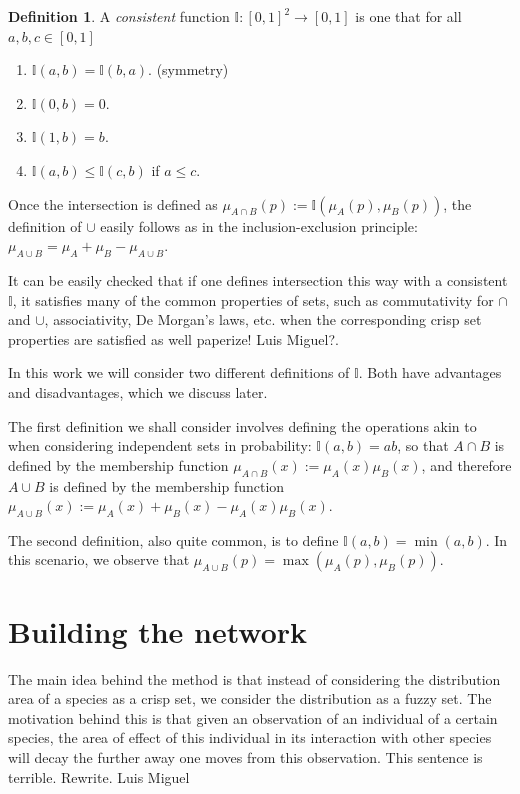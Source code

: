 \documentclass[12pt]{article}
\numberwithin{equation}{section} %
\numberwithin{figure}{section} %
\def\II{{\mathbb{I}}}
\theoremstyle{definition}
\newtheorem{definition}[theorem]{Definition}
\def\tcr#1{\textcolor{MyRed}{#1}}
\begin{document}
\begin{definition}
A \emph{consistent} function $\II : [0,1]^2 \to [0,1]$ is one that for all $a,b,c\in[0,1]$
\begin{enumerate}
  \item $\II(a,b) = \II(b,a)$. (symmetry)
  \item $\II(0,b) = 0$.
  \item $\II(1,b) = b$.
  \item $\II(a,b) \leq \II(c,b)$ if $a \leq c$.
\end{enumerate}
\end{definition}

Once the intersection is defined as $\mu_{A\cap B}(p) := \II(\mu_A(p),\mu_B(p))$, the definition of $\cup$ easily follows as in the inclusion-exclusion principle: $\mu_{A\cup B} = \mu_A + \mu_B - \mu_{A\cup B}$.

It can be easily checked that if one defines intersection this way with a consistent $\II$, it satisfies many of the common properties of sets, such as commutativity for $\cap$ and $\cup$, associativity, De Morgan's laws, etc. when the corresponding crisp set properties are satisfied as well \tcr{paperize! Luis Miguel?}.



In this work we will consider two different definitions of $\II$. Both have advantages and disadvantages, which we discuss later.

The first definition we shall consider involves defining the operations akin to when considering independent sets in probability: $\II(a,b) = ab$, so that $A\cap B$ is defined by the membership function $\mu_{A\cap B} (x) := \mu_A(x)\mu_B(x)$, and therefore $A\cup B$ is defined by the membership function $\mu_{A\cup B} (x) := \mu_A(x)+\mu_B(x)-\mu_A(x)\mu_B(x)$.

The second definition, also quite common, is to define $\II(a,b) = \min(a,b)$. In this scenario, we observe that $\mu_{A\cup B}(p) = \max(\mu_A(p),\mu_B(p))$.

\section{Building the network}

The main idea behind the method is that instead of considering the distribution area of a species as a crisp set, we consider the distribution as a fuzzy set. The motivation behind this is that given an observation of an individual of a certain species, the area of effect of this individual in its interaction with other species will decay the further away one moves from this observation. \tcr{This sentence is terrible. Rewrite. \tcr{Luis Miguel}}
\end{document}
